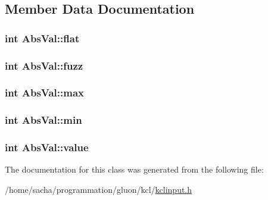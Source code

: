 \subsection{Member Data Documentation}
\hypertarget{class_abs_val_87b40db59ddae36a643ca1a071b52116}{
\subsubsection[{flat}]{\setlength{\rightskip}{0pt plus 5cm}int {\bf AbsVal::flat}}}
\label{class_abs_val_87b40db59ddae36a643ca1a071b52116}


\hypertarget{class_abs_val_872d15b6f387725daaaeb2e947a8ddde}{
\subsubsection[{fuzz}]{\setlength{\rightskip}{0pt plus 5cm}int {\bf AbsVal::fuzz}}}
\label{class_abs_val_872d15b6f387725daaaeb2e947a8ddde}


\hypertarget{class_abs_val_e3764282970217b3f29827fe57da2a92}{
\subsubsection[{max}]{\setlength{\rightskip}{0pt plus 5cm}int {\bf AbsVal::max}}}
\label{class_abs_val_e3764282970217b3f29827fe57da2a92}


\hypertarget{class_abs_val_54069174e3b0dce6d75441750c2cb847}{
\subsubsection[{min}]{\setlength{\rightskip}{0pt plus 5cm}int {\bf AbsVal::min}}}
\label{class_abs_val_54069174e3b0dce6d75441750c2cb847}


\hypertarget{class_abs_val_dea4f7aaaa630dc1e6784f3ce53294d6}{
\subsubsection[{value}]{\setlength{\rightskip}{0pt plus 5cm}int {\bf AbsVal::value}}}
\label{class_abs_val_dea4f7aaaa630dc1e6784f3ce53294d6}




The documentation for this class was generated from the following file:\begin{CompactItemize}
\item 
/home/sacha/programmation/gluon/kcl/\hyperlink{kclinput_8h}{kclinput.h}\end{CompactItemize}
